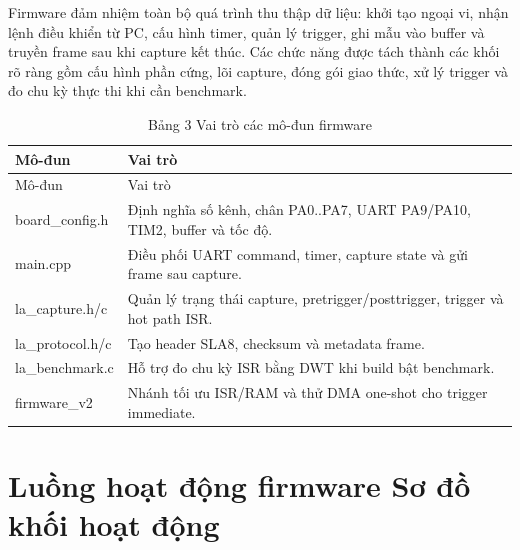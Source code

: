 Firmware đảm nhiệm toàn bộ quá trình thu thập dữ liệu: khởi tạo ngoại vi, nhận lệnh điều khiển từ PC, cấu hình timer, quản lý trigger, ghi mẫu vào buffer và truyền frame sau khi capture kết thúc. Các chức năng được tách thành các khối rõ ràng gồm cấu hình phần cứng, lõi capture, đóng gói giao thức, xử lý trigger và đo chu kỳ thực thi khi cần benchmark.

\begin{longtable}[]{@{}
  >{\raggedright\arraybackslash}p{}
  >{\raggedright\arraybackslash}p{}@{}}
\caption{Bảng 3 Vai trò các mô-đun firmware}\tabularnewline
\toprule\noalign{}
\begin{minipage}[b]{\linewidth}\raggedright
Mô-đun
\end{minipage} & \begin{minipage}[b]{\linewidth}\raggedright
Vai trò
\end{minipage} \\
\midrule\noalign{}
\endfirsthead
\toprule\noalign{}
\begin{minipage}[b]{\linewidth}\raggedright
Mô-đun
\end{minipage} & \begin{minipage}[b]{\linewidth}\raggedright
Vai trò
\end{minipage} \\
\midrule\noalign{}
\endhead
\bottomrule\noalign{}
\endlastfoot
board\_config.h & Định nghĩa số kênh, chân PA0..PA7, UART PA9/PA10, TIM2, buffer và tốc độ. \\
main.cpp & Điều phối UART command, timer, capture state và gửi frame sau capture. \\
la\_capture.h/c & Quản lý trạng thái capture, pretrigger/posttrigger, trigger và hot path ISR. \\
la\_protocol.h/c & Tạo header SLA8, checksum và metadata frame. \\
la\_benchmark.c & Hỗ trợ đo chu kỳ ISR bằng DWT khi build bật benchmark. \\
firmware\_v2 & Nhánh tối ưu ISR/RAM và thử DMA one-shot cho trigger immediate. \\
\end{longtable}

\section{Luồng hoạt động firmware Sơ đồ khối hoạt động}\label{luux1ed3ng-houx1ea1t-ux111ux1ed9ng-firmware-sux1a1-ux111ux1ed3-khux1ed1i-houx1ea1t-ux111ux1ed9ng}

